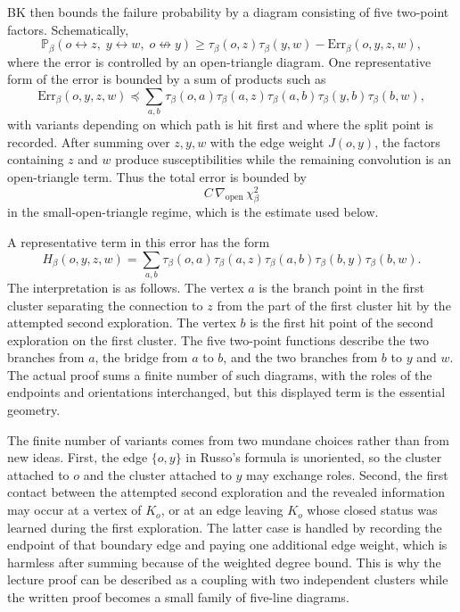 \documentclass[11pt,reqno]{book}
\numberwithin{equation}{chapter}
\theoremstyle{plain}
\theoremstyle{definition}
\theoremstyle{remark}
\newcommand{\Pb}{\mathbb P_\beta}
\newcommand{\1}{\mathbf 1}
\newcommand{\pre}{\preceq}
\begin{document}
BK then bounds the failure probability by a diagram consisting of five
two-point factors. Schematically,
\[
  \Pb(o\leftrightarrow z,\;y\leftrightarrow w,\;o\not\leftrightarrow y)
  \geq
  \tau_\beta(o,z)\tau_\beta(y,w)
  -
  \mathrm{Err}_\beta(o,y,z,w),
\]
where the error is controlled by an open-triangle diagram.
One representative form of the error is bounded by a sum of products such as
\[
  \mathrm{Err}_\beta(o,y,z,w)
  \pre
  \sum_{a,b}
  \tau_\beta(o,a)\tau_\beta(a,z)
  \tau_\beta(a,b)
  \tau_\beta(y,b)\tau_\beta(b,w),
\]
with variants depending on which path is hit first and where the split point is recorded. After summing over $z,y,w$ with the edge weight $J(o,y)$, the factors containing $z$ and $w$ produce susceptibilities while the remaining convolution is an open-triangle term. Thus the total error is bounded by
\[
  C\,\nabla_{\mathrm{open}}\,\chi_\beta^2
\]
in the small-open-triangle regime, which is the estimate used below.

A representative term in this error has the form
\[
  H_\beta(o,y,z,w)
  =
  \sum_{a,b}
  \tau_\beta(o,a)\tau_\beta(a,z)
  \tau_\beta(a,b)
  \tau_\beta(b,y)\tau_\beta(b,w).
\]
The interpretation is as follows. The vertex $a$ is the branch point in the first cluster separating the connection to $z$ from the part of the first cluster hit by the attempted second exploration. The vertex $b$ is the first hit point of the second exploration on the first cluster. The five two-point functions describe the two branches from $a$, the bridge from $a$ to $b$, and the two branches from $b$ to $y$ and $w$. The actual proof sums a finite number of such diagrams, with the roles of the endpoints and orientations interchanged, but this displayed term is the essential geometry.

The finite number of variants comes from two mundane choices rather than from new ideas. First, the edge \(\{o,y\}\) in Russo's formula is unoriented, so the cluster attached to \(o\) and the cluster attached to \(y\) may exchange roles. Second, the first contact between the attempted second exploration and the revealed information may occur at a vertex of \(K_o\), or at an edge leaving \(K_o\) whose closed status was learned during the first exploration. The latter case is handled by recording the endpoint of that boundary edge and paying one additional edge weight, which is harmless after summing because of the weighted degree bound. This is why the lecture proof can be described as a coupling with two independent clusters while the written proof becomes a small family of five-line diagrams.
\end{document}
